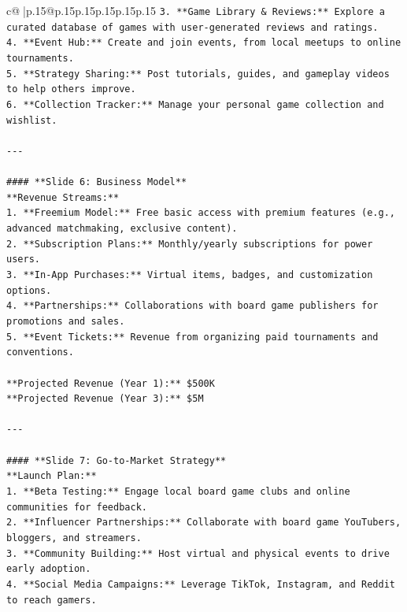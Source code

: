 \documentclass{article}
\begin{document}
{\begin{supertabular}{c@{$\;$}|p{.15\linewidth}@{}p{.15\linewidth}p{.15\linewidth}p{.15\linewidth}p{.15\linewidth}p{.15\linewidth}}
{{{\texttt{3. **Game Library \& Reviews:** Explore a curated database of games with user{-}generated reviews and ratings.  } \\
\texttt{4. **Event Hub:** Create and join events, from local meetups to online tournaments.  } \\
\texttt{5. **Strategy Sharing:** Post tutorials, guides, and gameplay videos to help others improve.  } \\
\texttt{6. **Collection Tracker:** Manage your personal game collection and wishlist.  } \\
\\ 
\texttt{{-}{-}{-}} \\
\\ 
\texttt{\#\#\#\# **Slide 6: Business Model**} \\
\texttt{**Revenue Streams:**  } \\
\texttt{1. **Freemium Model:** Free basic access with premium features (e.g., advanced matchmaking, exclusive content).  } \\
\texttt{2. **Subscription Plans:** Monthly/yearly subscriptions for power users.  } \\
\texttt{3. **In{-}App Purchases:** Virtual items, badges, and customization options.  } \\
\texttt{4. **Partnerships:** Collaborations with board game publishers for promotions and sales.  } \\
\texttt{5. **Event Tickets:** Revenue from organizing paid tournaments and conventions.  } \\
\\ 
\texttt{**Projected Revenue (Year 1):** \$500K  } \\
\texttt{**Projected Revenue (Year 3):** \$5M  } \\
\\ 
\texttt{{-}{-}{-}} \\
\\ 
\texttt{\#\#\#\# **Slide 7: Go{-}to{-}Market Strategy**} \\
\texttt{**Launch Plan:**  } \\
\texttt{1. **Beta Testing:** Engage local board game clubs and online communities for feedback.  } \\
\texttt{2. **Influencer Partnerships:** Collaborate with board game YouTubers, bloggers, and streamers.  } \\
\texttt{3. **Community Building:** Host virtual and physical events to drive early adoption.  } \\
\texttt{4. **Social Media Campaigns:** Leverage TikTok, Instagram, and Reddit to reach gamers.  } \\
}}}
\end{supertabular}}
\end{document}
